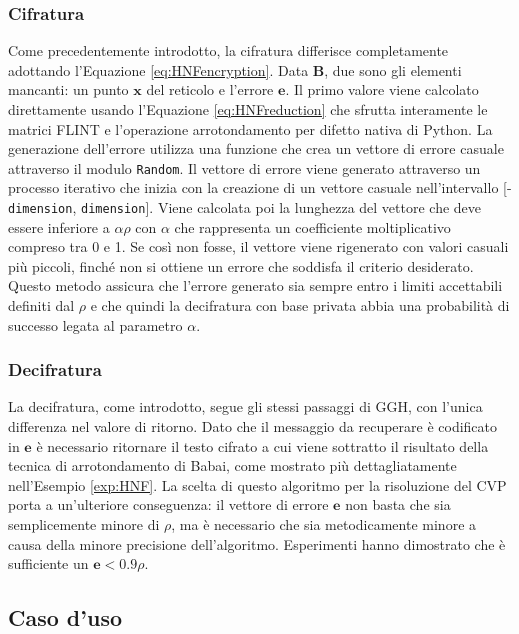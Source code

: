 \subsubsection{Cifratura}

Come precedentemente introdotto, la cifratura differisce completamente adottando 
l'Equazione \ref{eq:HNFencryption}. Data $\mathbf{B}$, due sono gli elementi mancanti: un punto $\mathbf{x}$ 
del reticolo e l'errore $\mathbf{e}$. Il primo valore viene calcolato direttamente usando
l'Equazione \ref{eq:HNFreduction}  che sfrutta interamente le matrici FLINT e l'operazione 
arrotondamento per difetto nativa di Python. 
La generazione dell'errore utilizza una funzione che crea un vettore di errore casuale
attraverso il modulo \texttt{Random}. Il vettore di errore viene generato attraverso un processo 
iterativo che inizia con la creazione di un vettore casuale nell'intervallo 
[-\texttt{dimension}, \texttt{dimension}]. Viene calcolata poi la lunghezza del vettore che 
deve essere inferiore a $\alpha\rho$ con $\alpha$ che rappresenta un coefficiente moltiplicativo 
compreso tra 0 e 1. Se così non fosse, il vettore viene rigenerato con valori casuali 
più piccoli, finché non si ottiene un errore che soddisfa il criterio desiderato. 
Questo metodo assicura che l'errore generato sia sempre entro i limiti accettabili definiti
dal $\rho$ e che quindi la decifratura con base privata abbia una probabilità di successo
legata al parametro $\alpha$.
\subsubsection{Decifratura}

La decifratura, come introdotto, segue gli stessi passaggi di GGH, con l'unica differenza 
nel valore di ritorno. Dato che il messaggio da recuperare è codificato in $\mathbf{e}$ è
necessario ritornare il testo cifrato a cui viene sottratto il risultato della tecnica
di arrotondamento di Babai, come mostrato più dettagliatamente nell'Esempio \ref{exp:HNF}. 
La scelta di questo algoritmo per la risoluzione del CVP porta a un'ulteriore conseguenza:
il vettore di errore $\mathbf{e}$ non basta che sia semplicemente minore di $\rho$, 
ma è necessario che sia metodicamente minore a causa della minore precisione dell'algoritmo. 
Esperimenti hanno dimostrato che è sufficiente un $\mathbf{e} < 0.9\rho$. 

\subsection{Caso d'uso}

